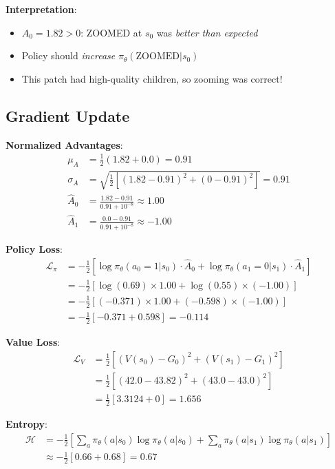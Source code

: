 \documentclass[11pt]{article}
\begin{document}
\textbf{Interpretation}:
\begin{itemize}[nosep]
    \item $A_0 = 1.82 > 0$: ZOOMED at $s_0$ was \emph{better than expected}
    \item Policy should \emph{increase} $\pi_\theta(\text{ZOOMED}|s_0)$
    \item This patch had high-quality children, so zooming was correct!
\end{itemize}

\subsection{Gradient Update}

\textbf{Normalized Advantages}:
\begin{align}
\mu_A &= \frac{1}{2}(1.82 + 0.0) = 0.91 \\
\sigma_A &= \sqrt{\frac{1}{2}[(1.82 - 0.91)^2 + (0 - 0.91)^2]} = 0.91 \\
\hat{A}_0 &= \frac{1.82 - 0.91}{0.91 + 10^{-8}} \approx 1.00 \\
\hat{A}_1 &= \frac{0.0 - 0.91}{0.91 + 10^{-8}} \approx -1.00
\end{align}

\textbf{Policy Loss}:
\begin{align}
\mathcal{L}_\pi &= -\frac{1}{2}\left[\log \pi_\theta(a_0=1|s_0) \cdot \hat{A}_0 + \log \pi_\theta(a_1=0|s_1) \cdot \hat{A}_1\right] \\
&= -\frac{1}{2}\left[\log(0.69) \times 1.00 + \log(0.55) \times (-1.00)\right] \\
&= -\frac{1}{2}\left[(-0.371)\times 1.00 + (-0.598)\times(-1.00)\right] \\
&= -\frac{1}{2}[-0.371 + 0.598] = \boxed{-0.114}
\end{align}

\textbf{Value Loss}:
\begin{align}
\mathcal{L}_V &= \frac{1}{2}\left[(V(s_0) - G_0)^2 + (V(s_1) - G_1)^2\right] \\
&= \frac{1}{2}\left[(42.0 - 43.82)^2 + (43.0 - 43.0)^2\right] \\
&= \frac{1}{2}\left[3.3124 + 0\right] = \boxed{1.656}
\end{align}

\textbf{Entropy}:
\begin{align}
\mathcal{H} &= -\frac{1}{2}\left[\sum_a \pi_\theta(a|s_0)\log\pi_\theta(a|s_0) + \sum_a \pi_\theta(a|s_1)\log\pi_\theta(a|s_1)\right] \\
&\approx -\frac{1}{2}[0.66 + 0.68] = \boxed{0.67}
\end{align}
\end{document}
